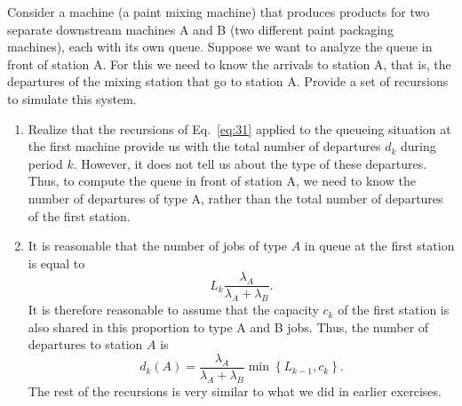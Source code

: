\begin{extra}
  Consider a machine (a paint mixing machine) that produces products for two separate downstream machines A and B (two different paint packaging machines), each with its own queue.
  Suppose we want to analyze the queue in front of station A.
  For this we need to know the arrivals to station A, that is, the departures of the mixing station that go to station A.
  Provide a set of recursions to simulate this system.
  \begin{solution}
\begin{enumerate}
\item Realize that the recursions of Eq.~\eqref{eq:31} applied to the
  queueing situation at the first machine provide us with the total
  number of departures $d_k$ during period $k$. However, it does not
  tell us about the type of these departures. Thus, to compute the
  queue in front of station A, we need to know the number of
  departures of type A, rather than the total number of departures of
  the first station.
\item It is reasonable that the number of jobs of type $A$ in queue at
  the first station is equal to
  \begin{equation*}
  L_k \frac{\lambda_A}{\lambda_A + \lambda_B}.
  \end{equation*}
  It is therefore reasonable to assume that the capacity $c_k$ of the
  first station is also shared in this proportion to type A and B
  jobs. Thus, the number of departures to station $A$ is
  \begin{equation*}
    d_k(A) = \frac{\lambda_A}{\lambda_A+\lambda_B} \min\left\{ L_{k-1}, c_k\right\}.
  \end{equation*}
 The rest of the recursions is very similar to what we did in earlier exercises.
\end{enumerate}
  \end{solution}
\end{extra}



